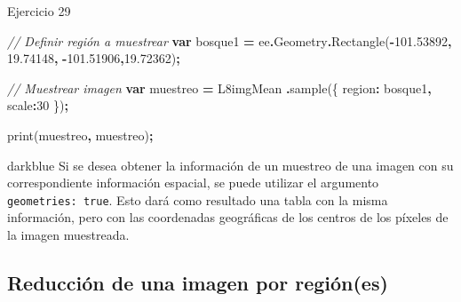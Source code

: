 \documentclass[
  12pt,
  letterpaper,
  twoside]{book}
\newenvironment{Shaded}{\begin{snugshade}}{\end{snugshade}}
\newcommand{\AttributeTok}[1]{\textcolor[rgb]{0.77,0.63,0.00}{#1}}
\newcommand{\CommentTok}[1]{\textcolor[rgb]{0.56,0.35,0.01}{\textit{#1}}}
\newcommand{\DataTypeTok}[1]{\textcolor[rgb]{0.13,0.29,0.53}{#1}}
\newcommand{\DecValTok}[1]{\textcolor[rgb]{0.00,0.00,0.81}{#1}}
\newcommand{\FloatTok}[1]{\textcolor[rgb]{0.00,0.00,0.81}{#1}}
\newcommand{\FunctionTok}[1]{\textcolor[rgb]{0.00,0.00,0.00}{#1}}
\newcommand{\KeywordTok}[1]{\textcolor[rgb]{0.13,0.29,0.53}{\textbf{#1}}}
\newcommand{\NormalTok}[1]{#1}
\newcommand{\OperatorTok}[1]{\textcolor[rgb]{0.81,0.36,0.00}{\textbf{#1}}}
\newcommand{\StringTok}[1]{\textcolor[rgb]{0.31,0.60,0.02}{#1}}
\begin{document}
Ejercicio 29

\begin{Shaded}
\begin{Highlighting}[]
\CommentTok{// Definir región a muestrear}
\KeywordTok{var}\NormalTok{ bosque1 }\OperatorTok{=}\NormalTok{ ee}\OperatorTok{.}\AttributeTok{Geometry}\OperatorTok{.}\FunctionTok{Rectangle}\NormalTok{(}\OperatorTok{{-}}\FloatTok{101.53892}\OperatorTok{,} \FloatTok{19.74148}\OperatorTok{,} 
  \OperatorTok{{-}}\FloatTok{101.51906}\OperatorTok{,}\FloatTok{19.72362}\NormalTok{)}\OperatorTok{;}
\end{Highlighting}
\end{Shaded}

\begin{Shaded}
\begin{Highlighting}[]
\CommentTok{// Muestrear imagen}
\KeywordTok{var}\NormalTok{ muestreo }\OperatorTok{=}\NormalTok{ L8imgMean}
  \OperatorTok{.}\FunctionTok{sample}\NormalTok{(\{}
    \DataTypeTok{region}\OperatorTok{:}\NormalTok{ bosque1}\OperatorTok{,}
    \DataTypeTok{scale}\OperatorTok{:}\DecValTok{30}
\NormalTok{  \})}\OperatorTok{;}

\FunctionTok{print}\NormalTok{(muestreo}\OperatorTok{,} \StringTok{\textquotesingle{}muestreo\textquotesingle{}}\NormalTok{)}\OperatorTok{;}
\end{Highlighting}
\end{Shaded}

\begin{bluebox2}

\begin{awesomeblock}{5pt}{\faLightbulb}{darkblue}
Si se desea obtener la información de un muestreo de una imagen con su correspondiente información espacial, se puede utilizar el argumento \texttt{geometries:\ true}. Esto dará como resultado una tabla con la misma información, pero con las coordenadas geográficas de los centros de los píxeles de la imagen muestreada.

\end{awesomeblock}

\end{bluebox2}

\hypertarget{reducciuxf3n-de-una-imagen-por-regiuxf3nes}{%
\subsection{Reducción de una imagen por región(es)}\label{reducciuxf3n-de-una-imagen-por-regiuxf3nes}}
\end{document}
